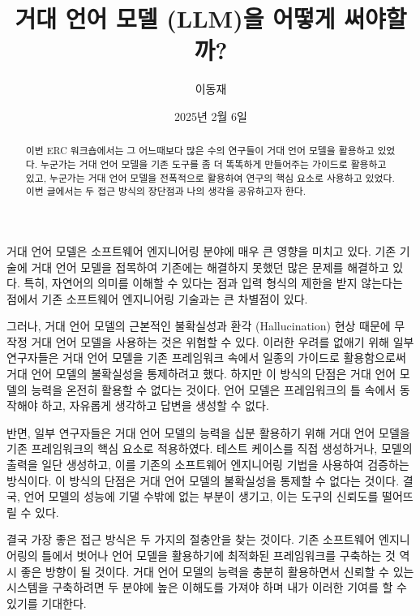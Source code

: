 \documentclass[11pt, oneside]{article}    %
\title{거대 언어 모델 (LLM)을 어떻게 써야할까?}
\author{이동재}
\date{2025년 2월 6일}
\begin{document}
\maketitle

\begin{abstract}
    이번 ERC 워크숍에서는 그 어느때보다 많은 수의 연구들이 거대 언어 모델을 활용하고 있었다. 누군가는 거대 언어 모델을 기존 도구를 좀 더 똑똑하게 만들어주는 가이드로 활용하고 있고, 누군가는 거대 언어 모델을 전폭적으로 활용하여 연구의 핵심 요소로 사용하고 있었다. 이번 글에서는 두 접근 방식의 장단점과 나의 생각을 공유하고자 한다.
\end{abstract}

    거대 언어 모델은 소프트웨어 엔지니어링 분야에 매우 큰 영향을 미치고 있다. 기존 기술에 거대 언어 모델을 접목하여 기존에는 해결하지 못했던 많은 문제를 해결하고 있다. 특히, 자연어의 의미를 이해할 수 있다는 점과 입력 형식의 제한을 받지 않는다는 점에서 기존 소프트웨어 엔지니어링 기술과는 큰 차별점이 있다.

    그러나, 거대 언어 모델의 근본적인 불확실성과 환각 (Hallucination) 현상 때문에 무작정 거대 언어 모델을 사용하는 것은 위험할 수 있다. 이러한 우려를 없애기 위해 일부 연구자들은 거대 언어 모델을 기존 프레임워크 속에서 일종의 가이드로 활용함으로써 거대 언어 모델의 불확실성을 통제하려고 했다. 하지만 이 방식의 단점은 거대 언어 모델의 능력을 온전히 활용할 수 없다는 것이다. 언어 모델은 프레임워크의 틀 속에서 동작해야 하고, 자유롭게 생각하고 답변을 생성할 수 없다.

    반면, 일부 연구자들은 거대 언어 모델의 능력을 십분 활용하기 위해 거대 언어 모델을 기존 프레임워크의 핵심 요소로 적용하였다. 테스트 케이스를 직접 생성하거나, 모델의 출력을 일단 생성하고, 이를 기존의 소프트웨어 엔지니어링 기법을 사용하여 검증하는 방식이다. 이 방식의 단점은 거대 언어 모델의 불확실성을 통제할 수 없다는 것이다. 결국, 언어 모델의 성능에 기댈 수밖에 없는 부분이 생기고, 이는 도구의 신뢰도를 떨어뜨릴 수 있다.

    결국 가장 좋은 접근 방식은 두 가지의 절충안을 찾는 것이다. 기존 소프트웨어 엔지니어링의 틀에서 벗어나 언어 모델을 활용하기에 최적화된 프레임워크를 구축하는 것 역시 좋은 방향이 될 것이다. 거대 언어 모델의 능력을 충분히 활용하면서 신뢰할 수 있는 시스템을 구축하려면 두 분야에 높은 이해도를 가져야 하며 내가 이러한 기여를 할 수 있기를 기대한다.
\end{document}
